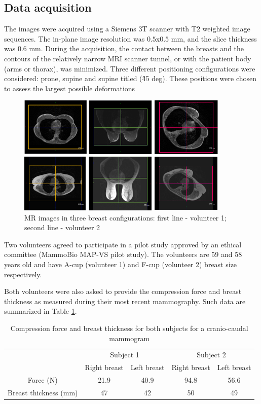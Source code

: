 \subsection{Data acquisition}\label{subsection:imageaquisition}

 The images were acquired using a Siemens 3T scanner with T2 weighted image sequences. The in-plane image resolution was $0.5$x$0.5$ mm, and the slice thickness was 0.6 mm. During the acquisition, the contact between the breasts and the contours of the  relatively narrow MRI scanner tunnel, or with the patient body (arms or thorax), was minimized. Three different positioning configurations were considered: prone, supine and supine titled (\~ 45 deg). These positions were chosen to assess the largest possible deformations
\begin{figure}[H]
\centering
\includegraphics[width=0.9\textwidth,keepaspectratio]{figures/patientData.png} 
\caption{MR images in three breast configurations: first line - volunteer 1; second line - volunteer 2}\label{fig:patientdata}
\end{figure}

Two volunteers agreed to participate in a pilot study approved by an ethical committee (MammoBio MAP-VS pilot study). The volunteers are 59 and 58 years old and have A-cup (volunteer 1) and F-cup (volunteer 2) breast size respectively. 
 

Both volunteers were also asked to provide the compression force and breast thickness as measured during their most recent mammography. Such data are summarized in Table \ref{tab:forceandthichnessdata}.
\begin{table}[H]
\centering
\begin{tabular}{c|c|c||c|c|}
\cline{2-5}
&\multicolumn{2}{c||}{Subject 1}&\multicolumn{2}{c|}{Subject 2}\\
\cline{2-5}
& Right breast & Left breast & Right breast & Left breast\\
\cline{2-5}
\hline
\multicolumn{1}{|c||}{Force (N)}  & 21.9 &40.9 &94.8 & 56.6 \\
\hline
\multicolumn{1}{|c||}{ Breast thickness (mm)} & 47 & 42 & 50 & 49 \\
\hline

\end{tabular}
\caption{Compression force and breast thickness for both subjects for a cranio-caudal mammogram}\label{tab:forceandthichnessdata}
\end{table}

